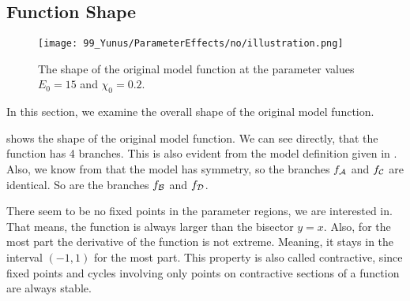 \subsection{Function Shape}

\begin{figure}
	\centering
	\texttt{[image: 99\_Yunus/ParameterEffects/no/illustration.png]}
	\caption[Shape of the original model function]{
		The shape of the original model function at the parameter values $E_0 = 15$ and $\chi_0 = 0.2$.
	}
	\label{fig:setup.char.shape}
\end{figure}

In this section, we examine the overall shape of the original model function.

 shows the shape of the original model function.
We can see directly, that the function has 4 branches.
This is also evident from the model definition given in .
Also, we know from  that the model has symmetry, so the branches $f_{\mathcal{A}}$ and $f_{\mathcal{C}}$ are identical.
So are the branches $f_{\mathcal{B}}$ and $f_{\mathcal{D}}$.

There seem to be no fixed points in the parameter regions, we are interested in.
That means, the function is always larger than the bisector $y=x$.
Also, for the most part the derivative of the function is not extreme.
Meaning, it stays in the interval $(-1, 1)$ for the most part.
This property is also called contractive, since fixed points and cycles involving only points on contractive sections of a function are always stable.
